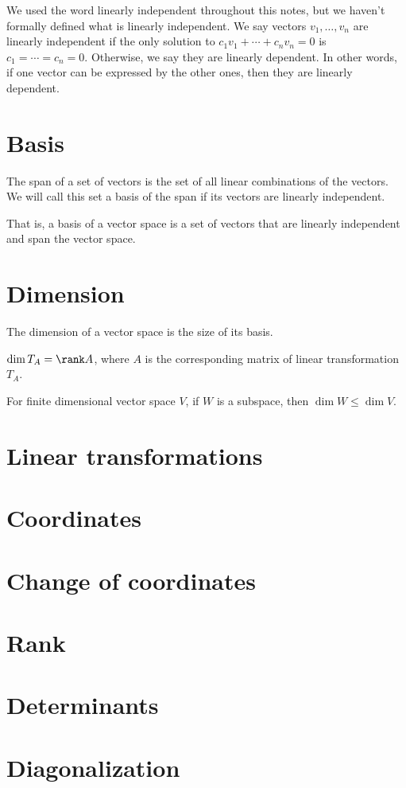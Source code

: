 \documentclass[11pt, cyan, night, 1in]{LatexTemplate/hw}
\begin{document}
We used the word linearly independent throughout this notes, but we haven't formally defined what is linearly independent. We say vectors $v_1,\dots,v_n$ are linearly independent if the only solution to $c_1v_1+\cdots+c_nv_n=0$ is $c_1=\cdots=c_n=0$. Otherwise, we say they are linearly dependent. In other words, if one vector can be expressed by the other ones, then they are linearly dependent.

\section{Basis}

The span of a set of vectors is the set of all linear combinations of the vectors. We will call this set a basis of the span if its vectors are linearly independent.

That is, a basis of a vector space is a set of vectors that are linearly independent and span the vector space.

\section{Dimension}

The dimension of a vector space is the size of its basis.

$\dim T_A = \rank A$, where $A$ is the corresponding matrix of linear transformation $T_A$. 

For finite dimensional vector space $V$, if $W$ is a subspace, then $\dim W \le \dim V$.

\section{Linear transformations}

\section{Coordinates}

\section{Change of coordinates}

\section{Rank}

\section{Determinants}

\section{Diagonalization}
\end{document}
